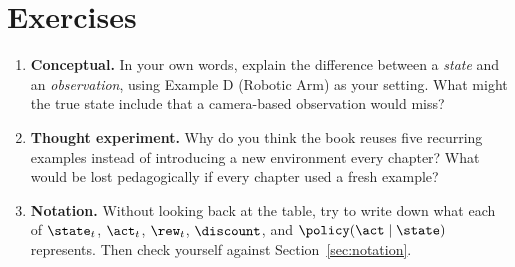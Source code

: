 
\section*{Exercises}

\begin{enumerate}
  \item \textbf{Conceptual.} In your own words, explain the difference
  between a \emph{state} and an \emph{observation}, using Example D
  (Robotic Arm) as your setting. What might the true state include that a
  camera-based observation would miss?

  \item \textbf{Thought experiment.} Why do you think the book reuses five
  recurring examples instead of introducing a new environment every
  chapter? What would be lost pedagogically if every chapter used a fresh
  example?

  \item \textbf{Notation.} Without looking back at the table, try to write
  down what each of $\state_t$, $\act_t$, $\rew_t$, $\discount$, and
  $\policy(\act \mid \state)$ represents. Then check yourself against
  Section~\ref{sec:notation}.
\end{enumerate}
